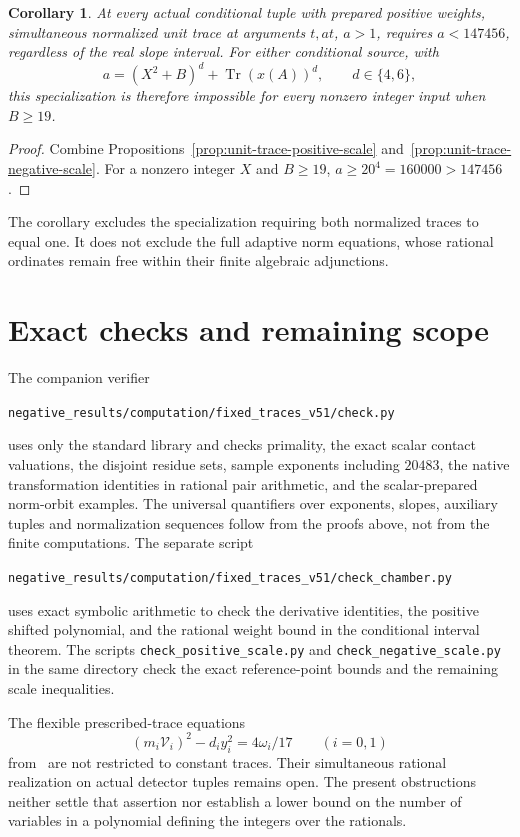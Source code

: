 \documentclass[11pt,a4paper]{article}
\newtheorem{corollary}[theorem]{Corollary}
\DeclareMathOperator{\Tr}{Tr}\DeclareMathOperator{\Nm}{N}
\begin{document}
\begin{corollary}\label{cor:unit-trace-conditional-scale}
At every actual conditional tuple with prepared positive weights,
simultaneous normalized unit trace at arguments $t,at$, $a>1$,
requires $a<147456$, regardless of the real slope interval.
For either conditional source, with
\[
       a=(X^2+B)^d+\Tr(x(A))^d,\qquad d\in\{4,6\},
\]
this specialization is therefore impossible for every nonzero integer
input when $B\ge19$.
\end{corollary}
\begin{proof}
Combine Propositions~\ref{prop:unit-trace-positive-scale}
and~\ref{prop:unit-trace-negative-scale}. For a nonzero integer $X$
and $B\ge19$, $a\ge20^4=160000>147456$.
\end{proof}

The corollary excludes the specialization requiring both normalized
traces to equal one. It does not exclude the full adaptive norm
equations, whose rational ordinates remain free within their finite
algebraic adjunctions.

\section{Exact checks and remaining scope}

The companion verifier
\begin{center}\small
\nolinkurl{negative_results/computation/fixed_traces_v51/check.py}
\end{center}
uses only the standard library and checks primality, the exact
scalar contact valuations, the disjoint residue sets, sample exponents
including $20483$, the native transformation identities in rational
pair arithmetic, and the scalar-prepared norm-orbit examples. The
universal quantifiers over exponents, slopes, auxiliary tuples and
normalization sequences follow from the proofs above, not from the
finite computations. The separate script
\begin{center}\small
\nolinkurl{negative_results/computation/fixed_traces_v51/check_chamber.py}
\end{center}
uses exact symbolic arithmetic to check the derivative identities, the
positive shifted polynomial, and the rational weight bound in the
conditional interval theorem. The scripts \texttt{check\_positive\_scale.py}
and \texttt{check\_negative\_scale.py} in the same directory check the
exact reference-point bounds and the remaining scale inequalities.

The flexible prescribed-trace equations
\[
                    (m_i\mathcal V_i)^2-d_i y_i^2=4\omega_i/17
                         \qquad(i=0,1)
\]
from~\cite{Adaptive} are not restricted to constant traces. Their
simultaneous rational realization on actual detector tuples remains
open. The present obstructions neither settle that assertion nor
establish a lower bound on the number of variables in a polynomial
defining the integers over the rationals.
\end{document}
